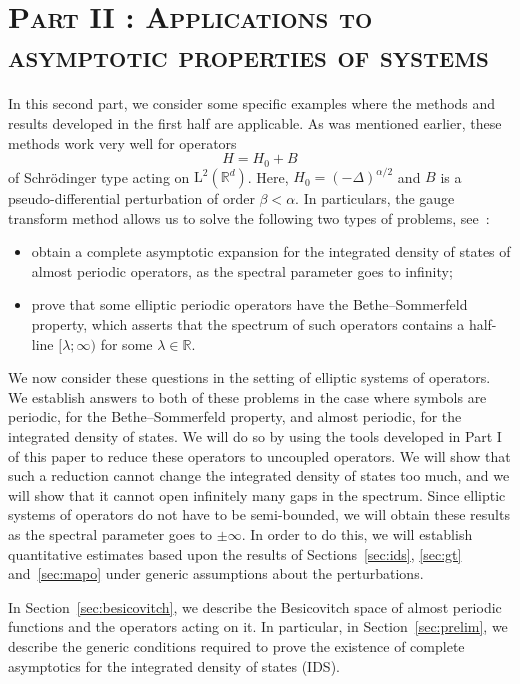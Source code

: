 \documentclass[AHL,Unicode,longabstracts,published]{cedram}
\newcommand{\RL}{\mathrm{L}}
\newcommand{\R}{\mathbb R}
\begin{document}
\section*{\textsc{Part II : Applications to asymptotic properties of systems}}


In this second part, we consider some specific examples where the methods and results developed in the first half are applicable. As was mentioned earlier, these methods work very well for operators
\[
H = H_0 + B
\]
of Schr\"odinger type acting on $\RL^2(\R^d)$. Here, $H_0 = (-\Delta)^{\alpha/2}$ and $B$ is a pseudo-differential perturbation of order $\beta < \alpha$. In particulars, the gauge transform method allows us to solve the following two types of problems, see~\cite{barbpar,MorParSht2014,parnovski,
ParSht2016,ParSht2012,ParSob2010,
Sobolev2006}:
\begin{itemize}
\item obtain a complete asymptotic expansion for the integrated density of states of almost periodic operators, as the spectral parameter goes to infinity;
\item prove that some elliptic periodic operators have the Bethe--Sommerfeld property, which asserts that the spectrum of such operators contains a half-line $[\lambda;\infty)$ for some $\lambda \in \R$.
\end{itemize}

We now consider these questions in the setting of elliptic systems of operators. We establish answers to both of these problems in the case where symbols are periodic, for the Bethe--Sommerfeld property, and almost periodic, for the integrated density of states. We will do so by using the tools developed in Part I of this paper to reduce these operators to uncoupled operators. We will show that such a reduction cannot change the integrated density of states too much, and we will show that it cannot open infinitely many gaps in the spectrum. Since elliptic systems of operators do not have to be semi-bounded, we will obtain these results as the spectral parameter goes to $\pm
\infty$. In order to do this, we will establish quantitative estimates based upon the results of Sections~\ref{sec:ids}, \ref{sec:gt} and~\ref{sec:mapo} under generic assumptions about the perturbations.

In Section~\ref{sec:besicovitch}, we describe the Besicovitch space of almost periodic functions and the operators acting on it. In particular, in Section~\ref{sec:prelim}, we describe the generic conditions required to prove the existence of complete asymptotics for the integrated density of states (IDS).
 
\end{document}
